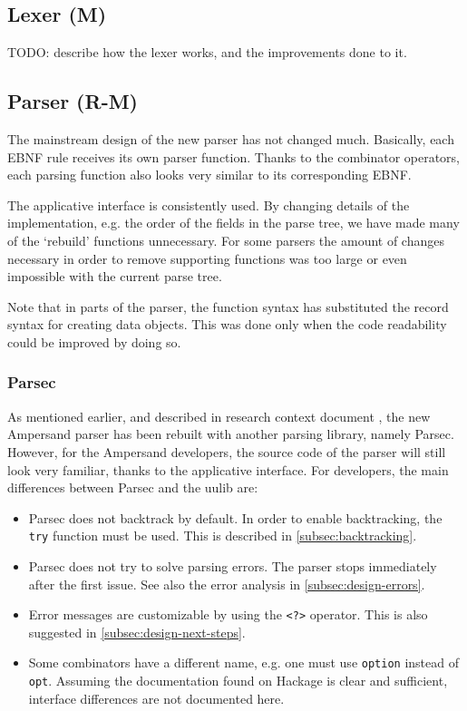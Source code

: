 \subsection{Lexer (M)}
\label{subsec:lexer}
TODO: describe how the lexer works, and the improvements done to it.

\subsection{Parser (R-M)}
\label{subsec:design-parser}
The mainstream design of the new parser has not changed much.
Basically, each EBNF rule receives its own parser function.
Thanks to the combinator operators, each parsing function also looks very similar to its corresponding EBNF.

The applicative interface is consistently used.
By changing details of the implementation, e.g. the order of the fields in the parse tree, we have made many of the `rebuild' functions unnecessary.
For some parsers the amount of changes necessary in order to remove supporting functions was too large or even impossible with the current parse tree.

Note that in parts of the parser, the function syntax has substituted the record syntax for creating data objects.
This was done only when the code readability could be improved by doing so.

\subsubsection{Parsec}
\label{subsec:design-parsing-lib}
As mentioned earlier, and described in research context document , the new Ampersand parser has been rebuilt with another parsing library, namely Parsec.
However, for the Ampersand developers, the source code of the parser will still look very familiar, thanks to the applicative interface.
For developers, the main differences between Parsec and the uulib are:
\begin{itemize}
  \item Parsec does not backtrack by default.
    In order to enable backtracking, the \texttt{try} function must be used.
    This is described in \autoref{subsec:backtracking}.
  \item Parsec does not try to solve parsing errors.
    The parser stops immediately after the first issue.
    See also the error analysis in \autoref{subsec:design-errors}.
  \item Error messages are customizable by using the \texttt{<?>} operator.
    This is also suggested in \autoref{subsec:design-next-steps}.
  \item Some combinators have a different name, e.g. one must use \texttt{option} instead of \texttt{opt}.
    Assuming the documentation found on Hackage is clear and sufficient, interface differences are not documented here.
\end{itemize}

